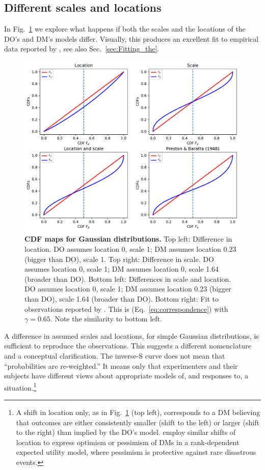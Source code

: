 \documentclass[a4paper, 12pt]{article}
\newcommand{\eref}[1]{(Eq.~\ref{eq:#1})}
\newcommand{\flabel}[1]{\label{fig:#1}}
\newcommand{\fref}[1]{Fig.~\ref{fig:#1}}
\newcommand{\seclabel}[1]{\label{sec:#1}}
\newcommand{\secref}[1]{Sec.~\ref{sec:#1}}
\begin{document}
\FloatBarrier

\subsection{Different scales and locations\seclabel{A_mismatch}}

In \fref{Gauss_scale_location_both_KT} we explore what happens if both the scales and the locations of the DO's and DM's models differ. Visually, this produces an excellent fit to empirical data reported by \textcite{TverskyKahneman1992}, see also \secref{Fitting_the}.
\begin{figure}[!htb]
\centering
\includegraphics[width=1.0\textwidth]{./figs/Gauss_scale_location_both_KT.pdf}
\caption{\textbf{CDF maps for Gaussian distributions.} Top left: Difference in location. DO assumes location 0, scale 1; DM assumes location 0.23 (bigger than DO), scale 1. Top right: Difference in scale. DO assumes location 0, scale 1; DM assumes location 0, scale 1.64 (broader than DO). Bottom left: Differences in scale and location. DO assumes location 0, scale 1; DM assumes location 0.23 (bigger than DO), scale 1.64 (broader than DO). Bottom right: Fit to observations reported by \textcite{TverskyKahneman1992}. This is \eref{correspondence} with $\gamma=0.65$. Note the similarity to bottom left.}
\flabel{Gauss_scale_location_both_KT}
\end{figure}
A difference in assumed scales and locations, for simple Gaussian distributions, is sufficient to reproduce the observations. This suggests a different nomenclature and a conceptual clarification. The inverse-S curve does not mean that ``probabilities are re-weighted.'' It means only that experimenters and their subjects have different views about appropriate models of, and responses to, a situation.\footnote{A shift in location only, as in \fref{Gauss_scale_location_both_KT} (top left), corresponds to a DM believing that outcomes are either consistently smaller (shift to the left) or larger (shift to the right) than implied by the DO's model. \textcite{PriceJones2020} employ similar shifts of location to express optimism or pessimism of DMs in a rank-dependent expected utility model, where pessimism is protective against rare disastrous events.}
\end{document}
